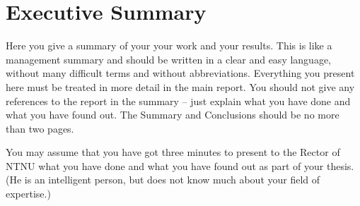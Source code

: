 \section*{Executive Summary}
Here you give a summary of your your work and your results. This is like a management summary and should be written in a clear and easy language, without many difficult terms and without abbreviations. Everything you present here must be treated in more detail in the main report. You should not give any references to the report in the summary -- just explain what you have done and what you have found out. The Summary and Conclusions should be no more than two pages.

You may assume that you have got three minutes to present to the Rector of NTNU  what you have done and what you have found out as part of your thesis. (He is an intelligent person, but does not know much about your field of expertise.)